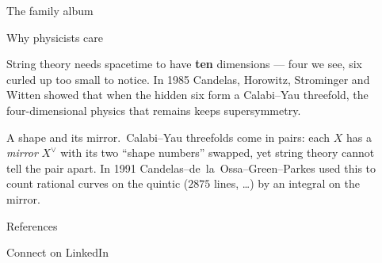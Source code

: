 \documentclass[final]{beamer}
\newlength{\sepwidth}
\newlength{\colwidth}
\newcommand{\separatorcolumn}{\begin{column}{\sepwidth}\end{column}}
\newcommand{\auterm}[1]{{\AUsemibold\color{AUblue}#1}}
\begin{document}
\begin{frame}[t]
\begin{columns}[t]
\begin{column}{\colwidth}
\begin{block}{The family album}
  \end{block}

  \begin{exampleblock}{Why physicists care}

    String theory needs spacetime to have \textbf{ten} dimensions --- four we
    see, six curled up too small to notice. In 1985 Candelas, Horowitz,
    Strominger and Witten showed that when the hidden six form a Calabi--Yau
    threefold, the four-dimensional physics that remains keeps supersymmetry.

    \auterm{A shape and its mirror.}\ Calabi--Yau threefolds come in pairs:
    each $X$ has a \emph{mirror} $X^{\vee}$ with its two ``shape numbers''
    swapped, yet string theory cannot tell the pair apart. In 1991
    Candelas--de~la~Ossa--Green--Parkes used this to count rational curves
    on the quintic ($2875$ lines, \dots) by an integral on the mirror.

  \end{exampleblock}

  \begin{block}{References}

    \begin{minipage}[c]{0.74\textwidth}
      \nocite{*}
      {\fontsize{14.8}{18.4}\selectfont}
    \end{minipage}\hfill
    \begin{minipage}[c]{0.20\textwidth}
      \centering
      {\color{AUblue}}\par
      \vspace{0.5ex}
      {\AUsemibold\fontsize{14.8}{18.4}\selectfont Connect on LinkedIn}
    \end{minipage}

  \end{block}

\end{column}

\separatorcolumn
\end{columns}
\end{frame}
\end{document}
